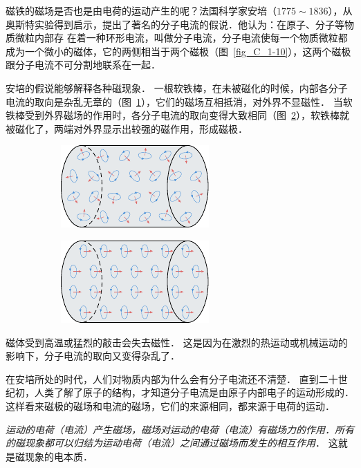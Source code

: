 磁铁的磁场是否也是由电荷的运动产生的呢？法国科学家安培（$1775 \sim 1836$），从奥斯特实验得到启示，提出了著名的分子电流的假说．他认为：在原子、分子等物质微粒内部存
在着一种环形电流，叫做分子电流，分子电流使每一个物质微粒都成为一个微小的磁体，它的两侧相当于两个磁极（图~\ref{fig_C_1-10}），这两个磁极跟分子电流不可分割地联系在一起．


安培的假说能够解释各种磁现象．
一根软铁棒，在未被磁化的时候，内部各分子电流的取向是杂乱无章的（图~\ref{fig_C_1-11a}），它们的磁场互相抵消，对外界不显磁性．
当软铁棒受到外界磁场的作用时，各分子电流的取向变得大致相同（图~\ref{fig_C_1-11b}），软铁棒就被磁化了，两端对外界显示出较强的磁作用，形成磁极．

\begin{figure}[htbp]
    \centering
    \begin{subfigure}{0.4\linewidth}
        \centering
        \includegraphics{fig/C/1-11a.pdf}
        \caption{}\label{fig_C_1-11a}
    \end{subfigure}
    \hfil
    \begin{subfigure}{0.4\linewidth}
        \centering
        \includegraphics{fig/C/1-11b.pdf}
        \caption{}\label{fig_C_1-11b}
    \end{subfigure}
    \caption{}\label{fig_C_1-11}
\end{figure}

磁体受到高温或猛烈的敲击会失去磁性．
这是因为在激烈的热运动或机械运动的影响下，分子电流的取向又变得杂乱了．

在安培所处的时代，人们对物质内部为什么会有分子电流还不清楚．
直到二十世纪初，人类了解了原子的结构，才知道分子电流是由原子内部电子的运动形成的．
这样看来磁极的磁场和电流的磁场，它们的来源相同，都来源于电荷的运动．

\textit{运动的电荷（电流）产生磁场，磁场对运动的电荷（电流）有磁场力的作用．所有的磁现象都可以归结为运动电荷（电流）之间通过磁场而发生的相互作用}．
这就是磁现象的电本质．

